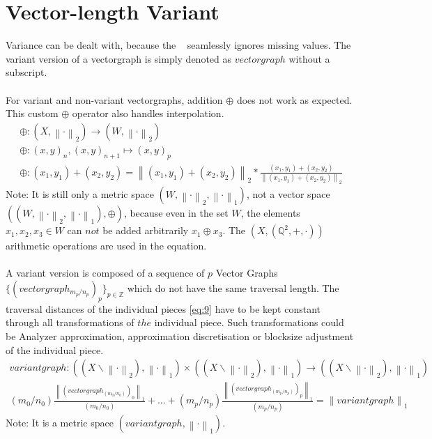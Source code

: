 \documentclass{report}
\newcommand\norm[1]{\left\lVert#1\right\rVert}
\begin{document}
\chapter{Vector-length Variant}
Variance can be dealt with, because the ~\cite[Stopeight\_Analyzer.tex]{Analyzer} seamlessly ignores missing values. The variant version of a vectorgraph is simply denoted as $vectorgraph$ without a subscript.\\\\
For variant and non-variant vectorgraphs, addition $\oplus$ does not work as expected. This custom $\oplus$ operator also handles interpolation.
\begin{align}
\oplus : (X, \norm{\cdot}_2) \rightarrow (W,\norm{\cdot}_2)\\
\oplus : (x,y)_{n},(x,y)_{n+1}\mapsto (x,y)_{p}\\
\oplus : (x_{1},y_{1})+(x_{2},y_{2})=\norm{(x_{1},y_{1})+(x_{2},y_{2})}_2*\frac{(x_{1},y_{1})+(x_{2},y_{2})}{\norm{(x_{1},y_{1})+(x_{2},y_{2})}_{2}}
\end{align}
Note: It is still only a metric space $(W,\norm{\cdot}_2,\norm{\cdot}_1)$, not a vector space $((W,\norm{\cdot}_2,\norm{\cdot}_1),\oplus)$, because even in the set $W$, the elements $x_{1},x_{2},x_{3} \in W$ can $not$ be added arbitrarily $x_{1}\oplus x_{3}$. The $(X,(\mathbb{Q}^2,+,\cdot))$ arithmetic operations are used in the equation.\\\\
A variant version is composed of a sequence of $p$ Vector Graphs $\{(vectorgraph_{m_{p}/n_{p}})_{p}\}_{p\in \mathbb{Z}}$ which do not have the same traversal length. The traversal distances of the individual pieces \eqref{eq:9} have to be kept constant through all transformations of $the$ individual piece. Such transformations could be Analyzer approximation, approximation discretisation or blocksize adjustment of the individual piece.
\begin{align}
variantgraph: ((X\backslash\norm{\cdot}_2),\norm{\cdot}_1)\times ((X\backslash\norm{\cdot}_2),\norm{\cdot}_1) \rightarrow ((X\backslash\norm{\cdot}_2),\norm{\cdot}_1)\\
(m_{0}/n_{0})\frac{\norm{(vectorgraph_{(m_{0}/n_{0})})_{0}}_{1}}{(m_{0}/n_{0})}+...+(m_{p}/n_{p})\frac{\norm{(vectorgraph_{(m_{p}/n_{p})})_{p}}_{1}}{(m_{p}/n_{p})}=\norm{variantgraph}_1
\end{align}
Note: It is a metric space $(variantgraph, \norm{\cdot}_1)$.
\end{document}
